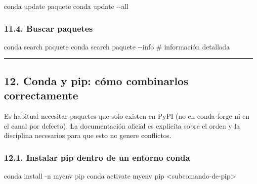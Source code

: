 \documentclass[
  doc,
  floatsintext,
  longtable,
  a4paper,
  nolmodern,
  notxfonts,
  notimes,
  12pt,
  colorlinks=true,linkcolor=blue,citecolor=blue,urlcolor=blue]{apa7}
\newenvironment{Shaded}{\begin{snugshade}}{\end{snugshade}}
\newcommand{\AttributeTok}[1]{\textcolor[rgb]{0.40,0.45,0.13}{#1}}
\newcommand{\CommentTok}[1]{\textcolor[rgb]{0.37,0.37,0.37}{#1}}
\newcommand{\ExtensionTok}[1]{\textcolor[rgb]{0.00,0.23,0.31}{#1}}
\newcommand{\NormalTok}[1]{\textcolor[rgb]{0.00,0.23,0.31}{#1}}
\newcommand{\OperatorTok}[1]{\textcolor[rgb]{0.37,0.37,0.37}{#1}}
\begin{document}
\begin{Shaded}
\begin{Highlighting}[]
\ExtensionTok{conda}\NormalTok{ update paquete}
\ExtensionTok{conda}\NormalTok{ update }\AttributeTok{{-}{-}all}
\end{Highlighting}
\end{Shaded}

\subsubsection{11.4. Buscar paquetes}\label{buscar-paquetes}

\begin{Shaded}
\begin{Highlighting}[]
\ExtensionTok{conda}\NormalTok{ search paquete}
\ExtensionTok{conda}\NormalTok{ search paquete }\AttributeTok{{-}{-}info}   \CommentTok{\# información detallada}
\end{Highlighting}
\end{Shaded}

\begin{center}\rule{0.5\linewidth}{0.5pt}\end{center}

\subsection{12. Conda y pip: cómo combinarlos
correctamente}\label{conda-y-pip-cuxf3mo-combinarlos-correctamente}

Es habitual necesitar paquetes que solo existen en PyPI (no en
conda-forge ni en el canal por defecto). La documentación oficial es
explícita sobre el orden y la disciplina necesarios para que esto no
genere conflictos.

\subsubsection{12.1. Instalar pip dentro de un entorno
conda}\label{instalar-pip-dentro-de-un-entorno-conda}

\begin{Shaded}
\begin{Highlighting}[]
\ExtensionTok{conda}\NormalTok{ install }\AttributeTok{{-}n}\NormalTok{ myenv pip}
\ExtensionTok{conda}\NormalTok{ activate myenv}
\ExtensionTok{pip} \OperatorTok{\textless{}}\NormalTok{subcomando{-}de{-}pip}\OperatorTok{\textgreater{}}
\end{Highlighting}
\end{Shaded}
\end{document}
